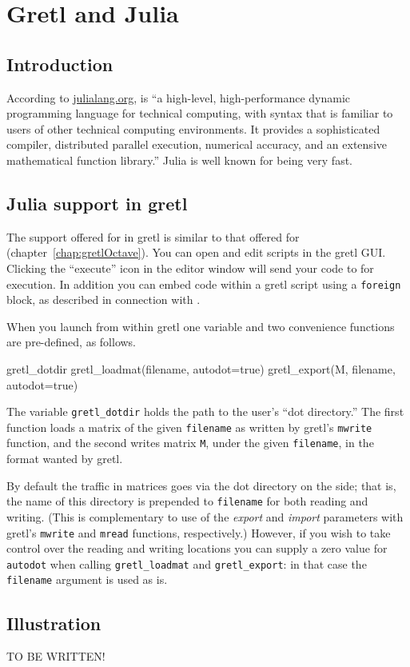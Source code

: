 \chapter{Gretl and Julia}
\label{chap:gretlJulia}

\section{Introduction}
\label{Julia-intro}

According to \url{julialang.org},  is ``a high-level,
high-performance dynamic programming language for technical computing,
with syntax that is familiar to users of other technical computing
environments. It provides a sophisticated compiler, distributed
parallel execution, numerical accuracy, and an extensive mathematical
function library.'' Julia is well known for being very fast.

\section{Julia support in gretl}
\label{sec:Julia-support}

The support offered for  in gretl is similar to that
offered for  (chapter~\ref{chap:gretlOctave}). You can
open and edit  scripts in the gretl GUI.  Clicking
the ``execute'' icon in the editor window will send your code to
 for execution. In addition you can embed 
code within a gretl script using a \texttt{foreign} block, as
described in connection with .

When you launch  from within gretl one variable and
two convenience functions are pre-defined, as follows.
\begin{code}
gretl_dotdir
gretl_loadmat(filename, autodot=true)
gretl_export(M, filename, autodot=true)
\end{code}
The variable \verb|gretl_dotdir| holds the path to the user's ``dot
directory.''  The first function loads a matrix of the given
\texttt{filename} as written by gretl's \texttt{mwrite}
function, and the second writes matrix \texttt{M}, under the given
\texttt{filename}, in the format wanted by gretl.

By default the traffic in matrices goes via the dot directory on the
 side; that is, the name of this directory is prepended to
\texttt{filename} for both reading and writing. (This is complementary
to use of the \textsl{export} and \textsl{import} parameters with
gretl's \texttt{mwrite} and \texttt{mread} functions,
respectively.) However, if you wish to take control over the reading
and writing locations you can supply a zero value for
\texttt{autodot} when calling \verb|gretl_loadmat| and
\verb|gretl_export|: in that case the \texttt{filename} argument is
used as is.

\section{Illustration}

TO BE WRITTEN!




